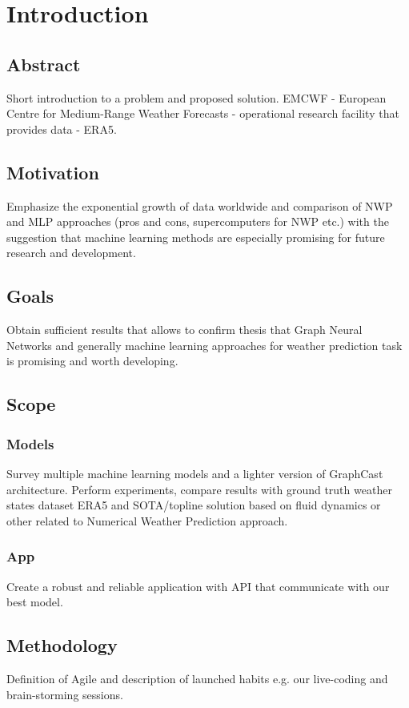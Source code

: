 
\chapter{Introduction}

\section{Abstract}
Short introduction to a problem and proposed solution. EMCWF - European Centre for Medium-Range Weather Forecasts - operational research facility that provides data - ERA5.

\section{Motivation}
Emphasize the exponential growth of data worldwide and comparison of NWP and MLP approaches (pros and cons, supercomputers for NWP etc.) with the suggestion that machine learning methods are especially promising for future research and development.

\section{Goals}
Obtain sufficient results that allows to confirm thesis that Graph Neural Networks and generally machine learning approaches for weather prediction task is promising and worth developing.

\section{Scope}

\subsection{Models}
Survey multiple machine learning models and a lighter version of GraphCast architecture. Perform experiments, compare results with ground truth weather states dataset ERA5 and SOTA/topline solution based on fluid dynamics or other related to Numerical Weather Prediction approach.

\subsection{App}
Create a robust and reliable application with API that communicate with our best model.

\section{Methodology}
Definition of Agile and description of launched habits e.g. our live-coding and brain-storming sessions. 
